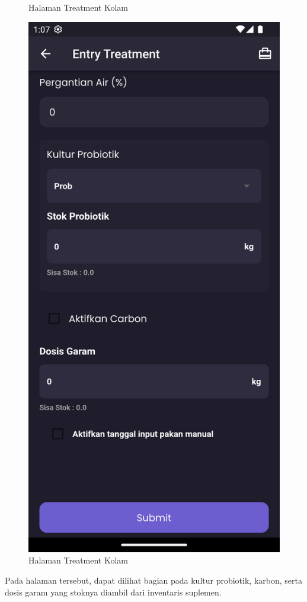 \begin{spacing}{1.5}
\begin{enumerate}
\begin{figure}[H]
				\caption{Halaman Treatment Kolam}
			\endminipage\hfill
				\includegraphics[width=\linewidth]{gambar/sprint4/treat_2.png}
				\caption{Halaman Treatment Kolam}
			\endminipage\hfill
		\end{figure}
		Pada halaman tersebut, dapat dilihat bagian pada kultur probiotik, karbon, serta dosis garam yang stoknya diambil dari inventaris suplemen.


\end{enumerate}
\end{spacing}
